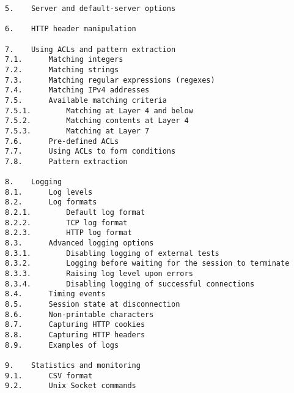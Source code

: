 \begin{verbatim}
5.    Server and default-server options

6.    HTTP header manipulation

7.    Using ACLs and pattern extraction
7.1.      Matching integers
7.2.      Matching strings
7.3.      Matching regular expressions (regexes)
7.4.      Matching IPv4 addresses
7.5.      Available matching criteria
7.5.1.        Matching at Layer 4 and below
7.5.2.        Matching contents at Layer 4
7.5.3.        Matching at Layer 7
7.6.      Pre-defined ACLs
7.7.      Using ACLs to form conditions
7.8.      Pattern extraction

8.    Logging
8.1.      Log levels
8.2.      Log formats
8.2.1.        Default log format
8.2.2.        TCP log format
8.2.3.        HTTP log format
8.3.      Advanced logging options
8.3.1.        Disabling logging of external tests
8.3.2.        Logging before waiting for the session to terminate
8.3.3.        Raising log level upon errors
8.3.4.        Disabling logging of successful connections
8.4.      Timing events
8.5.      Session state at disconnection
8.6.      Non-printable characters
8.7.      Capturing HTTP cookies
8.8.      Capturing HTTP headers
8.9.      Examples of logs

9.    Statistics and monitoring
9.1.      CSV format
9.2.      Unix Socket commands


\end{verbatim}
